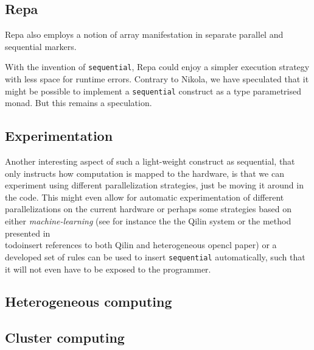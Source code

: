 \subsection{Repa}

Repa also employs a notion of array manifestation in separate parallel and
sequential markers.

With the invention of \lstinline{sequential}, Repa could enjoy a simpler
execution strategy with less space for runtime errors.  Contrary to Nikola, we
have speculated that it might be possible to implement a
\lstinline{sequential} construct as a type parametrised monad. But this
remains a speculation.

\subsection{Experimentation}
Another interesting aspect of such a light-weight construct as
sequential, that only instructs how computation is mapped to the
hardware, is that we can experiment using different parallelization
strategies, just be moving it around in the code. This might even
allow for automatic experimentation of different parallelizations on
the current hardware or perhaps some strategies based on either
\emph{machine-learning} (see for instance the the Qilin system or the
method presented in \\todo{insert references to both Qilin and
  heterogeneous opencl paper}) or a developed set of rules can be used
to insert \lstinline{sequential} automatically, such that it will not
even have to be exposed to the programmer.

\subsection{Heterogeneous computing}

\subsection{Cluster computing}



